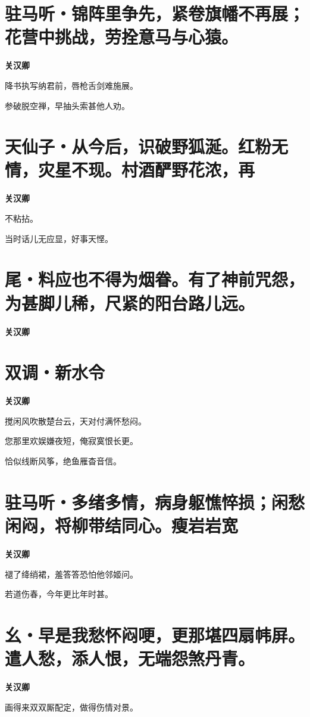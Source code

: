 \documentclass[12pt,a4paper]{ctexbook}
\begin{document}
\section{驻马听・锦阵里争先，紧卷旗幡不再展；花营中挑战，劳拴意马与心猿。}
\textbf{关汉卿}\par\vspace{0.5em}
降书执写纳君前，唇枪舌剑难施展。\par
参破脱空禅，早抽头索甚他人劝。\par

\section{天仙子・从今后，识破野狐涎。红粉无情，灾星不现。村酒酽野花浓，再}
\textbf{关汉卿}\par\vspace{0.5em}
不粘拈。\par
当时话儿无应显，好事天悭。\par

\section{尾・料应也不得为烟眷。有了神前咒怨，为甚脚儿稀，尺紧的阳台路儿远。}
\textbf{关汉卿}\par\vspace{0.5em}

\section{双调・新水令}
\textbf{关汉卿}\par\vspace{0.5em}
搅闲风吹散楚台云，天对付满怀愁闷。\par
您那里欢娱嫌夜短，俺寂寞恨长更。\par
恰似线断风筝，绝鱼雁杳音信。\par

\section{驻马听・多绪多情，病身躯憔悴损；闲愁闲闷，将柳带结同心。瘦岩岩宽}
\textbf{关汉卿}\par\vspace{0.5em}
褪了绛绡裙，羞答答恐怕他邻姬问。\par
若道伤春，今年更比年时甚。\par

\section{幺・早是我愁怀闷哽，更那堪四扇帏屏。遣人愁，添人恨，无端怨煞丹青。}
\textbf{关汉卿}\par\vspace{0.5em}
画得来双双厮配定，做得伤情对景。\par
\end{document}
